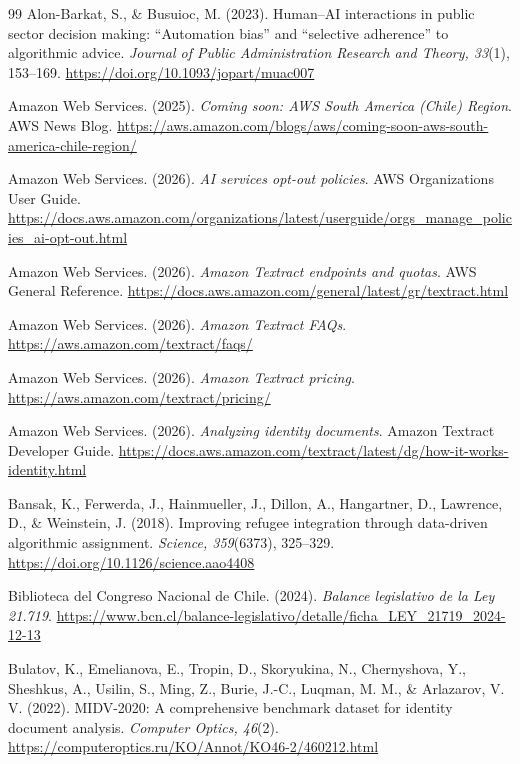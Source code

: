 \documentclass[11pt,a4paper]{article}
\begin{document}
\begin{thebibliography}{99}
\small
{}
Alon-Barkat, S., \& Busuioc, M. (2023). Human--AI interactions in public sector decision making: ``Automation bias'' and ``selective adherence'' to algorithmic advice. \emph{Journal of Public Administration Research and Theory, 33}(1), 153--169. \url{https://doi.org/10.1093/jopart/muac007}

Amazon Web Services. (2025). \emph{Coming soon: AWS South America (Chile) Region}. AWS News Blog. \url{https://aws.amazon.com/blogs/aws/coming-soon-aws-south-america-chile-region/}

Amazon Web Services. (2026). \emph{AI services opt-out policies}. AWS Organizations User Guide. \url{https://docs.aws.amazon.com/organizations/latest/userguide/orgs_manage_policies_ai-opt-out.html}

Amazon Web Services. (2026). \emph{Amazon Textract endpoints and quotas}. AWS General Reference. \url{https://docs.aws.amazon.com/general/latest/gr/textract.html}

Amazon Web Services. (2026). \emph{Amazon Textract FAQs}. \url{https://aws.amazon.com/textract/faqs/}

Amazon Web Services. (2026). \emph{Amazon Textract pricing}. \url{https://aws.amazon.com/textract/pricing/}

Amazon Web Services. (2026). \emph{Analyzing identity documents}. Amazon Textract Developer Guide. \url{https://docs.aws.amazon.com/textract/latest/dg/how-it-works-identity.html}

Bansak, K., Ferwerda, J., Hainmueller, J., Dillon, A., Hangartner, D., Lawrence, D., \& Weinstein, J. (2018). Improving refugee integration through data-driven algorithmic assignment. \emph{Science, 359}(6373), 325--329. \url{https://doi.org/10.1126/science.aao4408}

Biblioteca del Congreso Nacional de Chile. (2024). \emph{Balance legislativo de la Ley 21.719}. \url{https://www.bcn.cl/balance-legislativo/detalle/ficha_LEY_21719_2024-12-13}

Bulatov, K., Emelianova, E., Tropin, D., Skoryukina, N., Chernyshova, Y., Sheshkus, A., Usilin, S., Ming, Z., Burie, J.-C., Luqman, M. M., \& Arlazarov, V. V. (2022). MIDV-2020: A comprehensive benchmark dataset for identity document analysis. \emph{Computer Optics, 46}(2). \url{https://computeroptics.ru/KO/Annot/KO46-2/460212.html}


\end{thebibliography}
\end{document}

